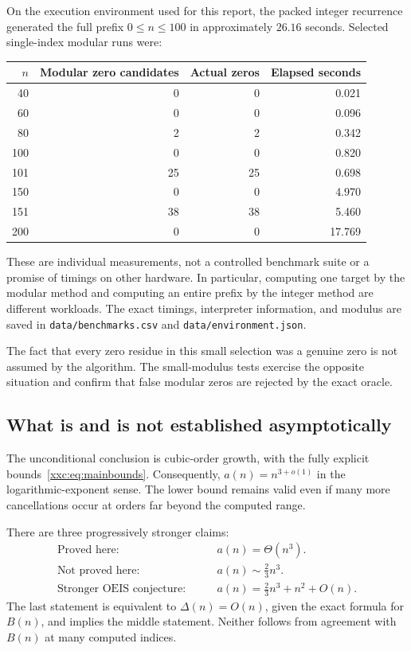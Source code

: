 \documentclass[11pt,a4paper]{article}
\numberwithin{equation}{section}
\theoremstyle{definition}
\theoremstyle{remark}
\theoremstyle{plain}
\begin{document}
On the execution environment used for this report, the packed integer
recurrence generated the full prefix $0\le n\le100$ in approximately
$26.16$ seconds. Selected single-index modular runs were:
\begin{center}
\begin{tabular}{rrrr}
\toprule
$n$ & Modular zero candidates & Actual zeros & Elapsed seconds\\
\midrule
40 & 0 & 0 & 0.021\\
60 & 0 & 0 & 0.096\\
80 & 2 & 2 & 0.342\\
100 & 0 & 0 & 0.820\\
101 & 25 & 25 & 0.698\\
150 & 0 & 0 & 4.970\\
151 & 38 & 38 & 5.460\\
200 & 0 & 0 & 17.769\\
\bottomrule
\end{tabular}
\end{center}
These are individual measurements, not a controlled benchmark suite or a
promise of timings on other hardware. In particular, computing one target
by the modular method and computing an entire prefix by the integer method
are different workloads. The exact timings, interpreter information, and
modulus are saved in \texttt{data/benchmarks.csv} and
\texttt{data/environment.json}.

The fact that every zero residue in this small selection was a genuine zero
is not assumed by the algorithm. The small-modulus tests exercise the
opposite situation and confirm that false modular zeros are rejected by
the exact oracle.

\subsection{What is and is not established asymptotically}

The unconditional conclusion is cubic-order growth, with the fully explicit
bounds~\eqref{xxc:eq:mainbounds}. Consequently, $a(n)=n^{3+o(1)}$ in the
logarithmic-exponent sense. The lower bound remains valid even if many more
cancellations occur at orders far beyond the computed range.

There are three progressively stronger claims:
\begin{align*}
 \text{Proved here:}\qquad &a(n)=\Theta(n^3).\\
 \text{Not proved here:}\qquad &a(n)\sim\frac23n^3.\\
 \text{Stronger OEIS conjecture:}\qquad
 &a(n)=\frac23n^3+n^2+O(n).
\end{align*}
The last statement is equivalent to $\Delta(n)=O(n)$, given the exact
formula for $B(n)$, and implies the middle statement. Neither follows from
agreement with $B(n)$ at many computed indices.
\end{document}
